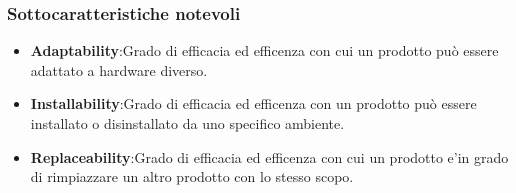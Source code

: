 \subsubsection{Sottocaratteristiche notevoli}
\begin{itemize}
	\item{\textbf{Adaptability}}:Grado di efficacia ed efficenza con cui un prodotto può essere adattato a hardware diverso.
	\item{\textbf{Installability}}:Grado di efficacia ed efficenza con un prodotto può essere installato o disinstallato da uno specifico ambiente.
	\item{\textbf{Replaceability}}:Grado di efficacia ed efficenza con cui un prodotto e'in grado di rimpiazzare un altro prodotto con lo stesso scopo.
\end{itemize}
\pagebreak
